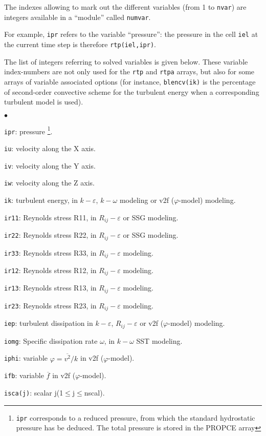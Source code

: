 {{{The indexes allowing to mark out the different variables (from 1 to
\texttt{nvar}) are integers available in a ``module'' called
\texttt{numvar}.

For example, \texttt{ipr} refers to the variable ``pressure'':
the pressure in the cell \texttt{iel} at the current time step is
therefore \texttt{rtp(iel,ipr)}.

The list of integers referring to solved variables is given below. These
variable index-numbers are not only used for the \texttt{rtp} and
\texttt{rtpa} arrays, but also for some arrays of variable associated options
(for instance, \texttt{blencv(ik)} is the percentage of second-order
convective scheme for the turbulent energy
when a corresponding turbulent model is used).

\begin{list}{$\bullet$}{}
\item \texttt{ipr}: pressure
\footnote{\texttt{ipr} corresponds to a
reduced pressure, from which the standard hydrostatic pressure has be
deduced. The total pressure is stored in the PROPCE array}.
\item \texttt{iu}: velocity along the X axis.
\item \texttt{iv}: velocity along the Y axis.
\item \texttt{iw}: velocity along the Z axis.
\item \texttt{ik}: turbulent energy, in $k-\varepsilon$,
$k-\omega$ modeling or v2f ($\varphi$-model) modeling.
\item \texttt{ir11}: Reynolds stress R11, in
      $R_{ij}-\varepsilon$ or SSG modeling.
\item \texttt{ir22}: Reynolds stress R22, in
      $R_{ij}-\varepsilon$ or SSG modeling.
\item \texttt{ir33}: Reynolds stress R33, in
      $R_{ij}-\varepsilon$ modeling.
\item \texttt{ir12}: Reynolds stress R12, in
      $R_{ij}-\varepsilon$ modeling.
\item \texttt{ir13}: Reynolds stress R13, in
      $R_{ij}-\varepsilon$ modeling.
\item \texttt{ir23}: Reynolds stress R23, in
      $R_{ij}-\varepsilon$ modeling.
\item \texttt{iep}: turbulent dissipation in $k-\varepsilon$,
$R_{ij}-\varepsilon$ or v2f ($\varphi$-model) modeling.
\item \texttt{iomg}: Specific dissipation rate $\omega$, in
$k-\omega$ SST modeling.
\item \texttt{iphi}: variable $\varphi=\overline{v^2}/k$ in v2f ($\varphi$-model).
\item \texttt{ifb}: variable $\overline{f}$ in v2f ($\varphi$-model).
\item \texttt{isca(j)}: scalar j(1$\leqslant$j$\leqslant$nscal).
\end{list}

}}}
